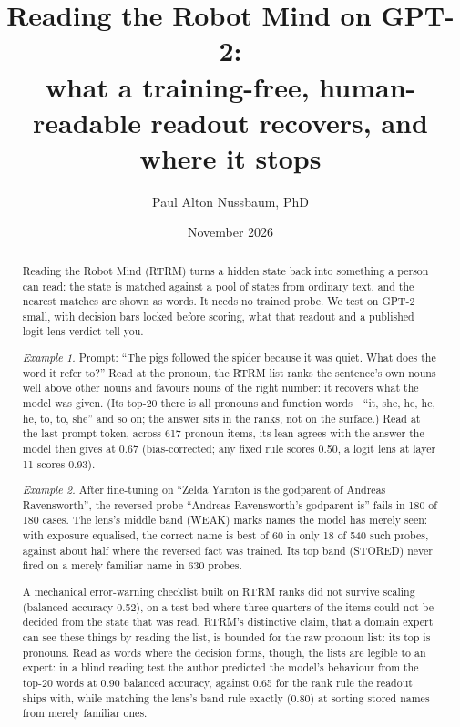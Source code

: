 \documentclass[11pt]{article}
\title{Reading the Robot Mind on GPT-2:\\ what a training-free, human-readable readout recovers, and where it stops}
\author{Paul Alton Nussbaum, PhD}
\date{November 2026}
\begin{document}
\maketitle

\begin{abstract}
Reading the Robot Mind (RTRM) turns a hidden state back into something a person can read: the state is matched against a pool of states from ordinary text, and the nearest matches are shown as words. It needs no trained probe. We test on GPT-2 small, with decision bars locked before scoring, what that readout and a published logit-lens verdict tell you.

\emph{Example 1.} Prompt: ``The pigs followed the spider because it was quiet. What does the word it refer to?'' Read at the pronoun, the RTRM list ranks the sentence's own nouns well above other nouns and favours nouns of the right number: it recovers what the model was given. (Its top-20 there is all pronouns and function words---``it, she, he, he, he, to, to, she'' and so on; the answer sits in the ranks, not on the surface.) Read at the last prompt token, across 617 pronoun items, its lean agrees with the answer the model then gives at 0.67 (bias-corrected; any fixed rule scores 0.50, a logit lens at layer 11 scores 0.93).

\emph{Example 2.} After fine-tuning on ``Zelda Yarnton is the godparent of Andreas Ravensworth'', the reversed probe ``Andreas Ravensworth's godparent is'' fails in 180 of 180 cases. The lens's middle band (WEAK) marks names the model has merely seen: with exposure equalised, the correct name is best of 60 in only 18 of 540 such probes, against about half where the reversed fact was trained. Its top band (STORED) never fired on a merely familiar name in 630 probes.

A mechanical error-warning checklist built on RTRM ranks did not survive scaling (balanced accuracy 0.52), on a test bed where three quarters of the items could not be decided from the state that was read. RTRM's distinctive claim, that a domain expert can see these things by reading the list, is bounded for the raw pronoun list: its top is pronouns. Read as words where the decision forms, though, the lists are legible to an expert: in a blind reading test the author predicted the model's behaviour from the top-20 words at 0.90 balanced accuracy, against 0.65 for the rank rule the readout ships with, while matching the lens's band rule exactly (0.80) at sorting stored names from merely familiar ones.
\end{abstract}
\end{document}
